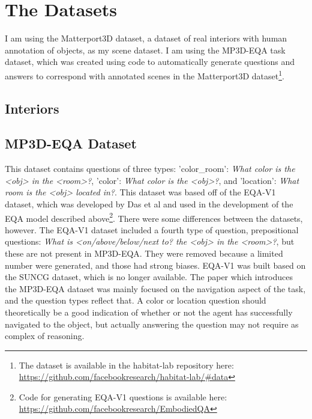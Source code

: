 \section{The Datasets}
I am using the Matterport3D dataset, a dataset of real interiors with human annotation of objects, as my scene dataset\cite{matterport}. 
I am using the MP3D-EQA task dataset, which was created using code to automatically generate questions and answers to correspond with annotated scenes in the Matterport3D dataset\footnote{The dataset is available in the habitat-lab repository here: \url{https://github.com/facebookresearch/habitat-lab/#data}}\cite{eqa_matterport}. 


\subsection{Interiors}

\subsection{MP3D-EQA Dataset} 
This dataset contains questions of three types: 'color\_room': \emph{What color is the <obj> in the <room>?}, 'color': \emph{What color is the <obj>?}, and 'location': \emph{What room is the <obj> located in?}. This dataset was based off of the EQA-V1 dataset, which was developed by Das et al and used in the development of the EQA model described above\footnote{Code for generating EQA-V1 questions is available here: \url{https://github.com/facebookresearch/EmbodiedQA}}\cite{embodiedqa}. There were some differences between the datasets, however. The EQA-V1 dataset included a fourth type of question, prepositional questions: \emph{What is <on/above/below/next to? the <obj> in the <room>?}, but these are not present in MP3D-EQA. They were removed because a limited number were generated, and those had strong biases. %
EQA-V1 was built based on the SUNCG dataset, which is no longer available. %
The paper which introduces the MP3D-EQA dataset was mainly focused on the navigation aspect of the task, and the question types reflect that. A color or location question should theoretically be a good indication of whether or not the agent has successfully navigated to the object, but actually answering the question may not require as complex of reasoning. 

